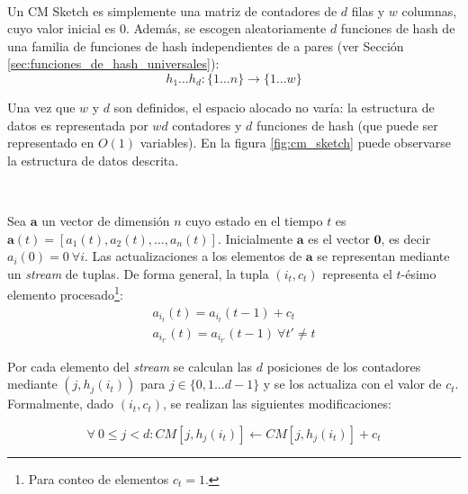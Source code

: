 \documentclass[a4paper,12pt, oneside]{article}
\begin{document}
\

Un CM Sketch es simplemente una matriz de contadores de $d$ filas y $w$ columnas, cuyo valor inicial es $0$. Además, se escogen aleatoriamente $d$ funciones de hash de una familia de funciones de hash independientes de a pares (ver Sección \ref{sec:funciones_de_hash_universales}):
\begin{equation*}
	h_1 \dots h_d: \{1 \dots n\} \rightarrow \{1 \dots w\}
\end{equation*}

Una vez que $w$ y $d$ son definidos, el espacio alocado no varía: la estructura de datos es representada por $wd$ contadores y $d$ funciones de hash (que puede ser representado en $O(1)$ variables\cite{Motwani:1995:RA:211390}). En la figura \ref{fig:cm_sketch} puede observarse la estructura de datos descrita.

\

Sea $\mathbf{a}$ un vector de dimensión $n$ cuyo estado en el tiempo $t$ es $\mathbf{a}(t)=[a_1(t), a_2(t), \dots, a_n(t)]$. Inicialmente $\mathbf{a}$ es el vector $\mathbf{0}$, es decir $a_i(0)=0 \ \forall i$. Las actualizaciones a los elementos de $\mathbf{a}$ se representan mediante un \textit{stream} de tuplas. De forma general, la tupla $(i_t, c_t)$ representa el $t$-ésimo elemento procesado\footnote{Para conteo de elementos $c_t=1$.}:
\begin{gather*}
a_{i_t}(t)=a_{i_t}(t-1) + c_t\\
a_{i_{t'}}(t)=a_{i_{t'}}(t-1) \ \forall t' \neq t 
\end{gather*}

Por cada elemento del \textit{stream} se calculan las $d$ posiciones de los contadores mediante $(j, h_j(i_t))$ para $j \in \{0,1 \dots d-1 \}$ y se los actualiza con el valor de $c_t$. Formalmente, dado $(i_t, c_t)$, se realizan las siguientes modificaciones:

\begin{equation}
\forall \ 0 \leq j < d: CM[j, h_j(i_t)] \leftarrow  CM[j, h_j(i_t)] + c_t
\end{equation}
\end{document}
